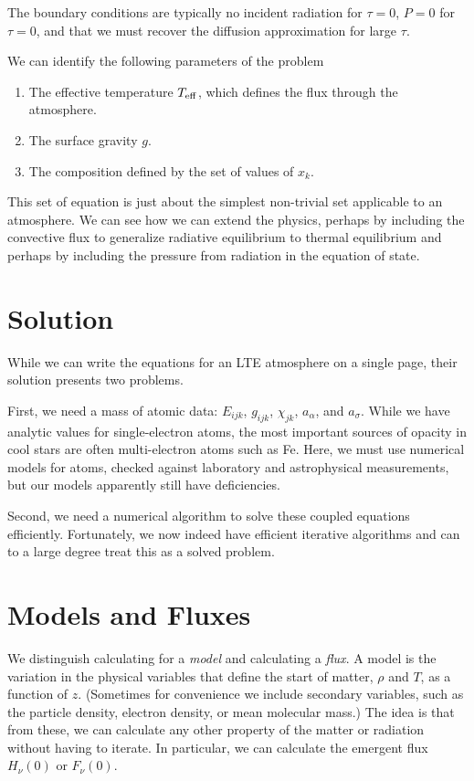\newslide
The boundary conditions are typically no incident radiation for $\tau = 0$, $P = 0$ for $\tau = 0$, and that we must recover the diffusion approximation for large $\tau$. 

\newslide
We can identify the following parameters of the problem
\begin{enumerate}
\item The effective temperature $T_\mathrm{eff}$, which defines the flux through the atmosphere.
\item The surface gravity $g$.
\item The composition defined by the set of values of $x_k$.
\end{enumerate}

This set of equation is just about the simplest non-trivial set applicable to an atmosphere. We can see how we can extend the physics, perhaps by including the convective flux to generalize radiative equilibrium to thermal equilibrium and perhaps by including the pressure from radiation in the equation of state.

\newslide

\section{Solution}

While we can write the equations for an LTE atmosphere on a single page, their solution presents two problems.

First, we need a mass of atomic data: $E_{ijk}$, $g_{ijk}$, $\chi_{jk}$, $a_\alpha$, and $a_\sigma$. While we have analytic values for single-electron atoms, the most important sources of opacity in cool stars are often multi-electron atoms such as Fe. Here, we must use numerical models for atoms, checked against laboratory and astrophysical measurements, but our models apparently still have deficiencies.

Second, we need a numerical algorithm to solve these coupled equations efficiently. Fortunately, we now indeed have efficient iterative algorithms and can to a large degree treat this as a solved problem.

\newslide

\section{Models and Fluxes}

We distinguish calculating for a \emph{model} and calculating a \emph{flux}. A model is the variation in the physical variables that define the start of matter, $\rho$ and $T$, as a function of $z$. (Sometimes for convenience we include secondary variables, such as the particle density, electron density, or mean molecular mass.) The idea is that from these, we can calculate any other property of the matter or radiation without having to iterate. In particular, we can calculate the emergent flux $H_\nu(0)$ or $F_\nu(0)$.

